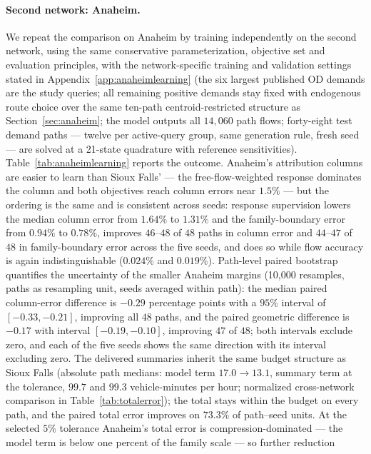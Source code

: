 \paragraph{Second network: Anaheim.}
We repeat the comparison on Anaheim by training independently on the
second network, using the same conservative parameterization,
objective set and evaluation principles, with the network-specific
training and validation settings stated in
Appendix~\ref{app:anaheimlearning} (the six largest published OD
demands are the study queries; all remaining positive demands stay
fixed with endogenous route choice over the same ten-path
centroid-restricted structure as Section~\ref{sec:anaheim}; the model
outputs all $14{,}060$ path flows; forty-eight test demand paths ---
twelve per active-query group, same generation rule, fresh seed ---
are solved at a 21-state quadrature with reference sensitivities).
Table~\ref{tab:anaheimlearning} reports the
outcome. Anaheim's attribution columns are easier to learn than Sioux
Falls' --- the free-flow-weighted response dominates the column and
both objectives reach column errors near $1.5\%$ --- but the ordering
is the same and is consistent across seeds: response supervision
lowers the median column error from $1.64\%$ to $1.31\%$ and the
family-boundary error from $0.94\%$ to $0.78\%$, improves $46$--$48$
of $48$ paths in column error and $44$--$47$ of $48$ in
family-boundary error across the five seeds, and does so while flow
accuracy is again indistinguishable ($0.024\%$ and $0.019\%$).
Path-level paired bootstrap quantifies the uncertainty of the smaller
Anaheim margins (10,000 resamples, paths as resampling unit, seeds
averaged within path): the median paired column-error difference is
$-0.29$ percentage points with a $95\%$ interval of $[-0.33,-0.21]$,
improving all $48$ paths, and the paired geometric difference is
$-0.17$ with interval $[-0.19,-0.10]$, improving $47$ of $48$; both
intervals exclude zero, and each of the five seeds shows the same
direction with its interval excluding zero. The
delivered summaries inherit the same budget structure as Sioux Falls
(absolute path medians: model term $17.0\to13.1$, summary term at the
tolerance, $99.7$ and $99.3$ vehicle-minutes per hour; normalized
cross-network comparison in Table~\ref{tab:totalerror}); the total
stays within the budget on every path, and the paired total error
improves on $73.3\%$ of path--seed units. At the selected $5\%$
tolerance Anaheim's total error is compression-dominated --- the model
term is below one percent of the family scale --- so further reduction
